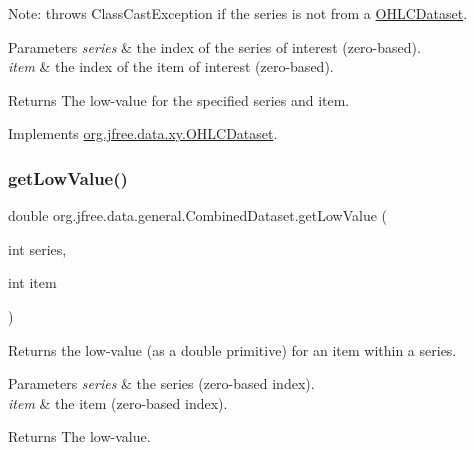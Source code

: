 Note\+: throws {\ttfamily Class\+Cast\+Exception} if the series is not from a \mbox{\hyperlink{}{O\+H\+L\+C\+Dataset}}.


\begin{DoxyParams}{Parameters}
{\em series} & the index of the series of interest (zero-\/based). \\
\hline
{\em item} & the index of the item of interest (zero-\/based).\\
\hline
\end{DoxyParams}
\begin{DoxyReturn}{Returns}
The low-\/value for the specified series and item. 
\end{DoxyReturn}


Implements \mbox{\hyperlink{interfaceorg_1_1jfree_1_1data_1_1xy_1_1_o_h_l_c_dataset_a87d7730829e66f23a2601c3519cf828a}{org.\+jfree.\+data.\+xy.\+O\+H\+L\+C\+Dataset}}.

\mbox{\label{classorg_1_1jfree_1_1data_1_1general_1_1_combined_dataset_a6bbbc0af890605eb5a42974c29a9c85b}} 
\subsubsection{\texorpdfstring{get\+Low\+Value()}{getLowValue()}}
{\footnotesize\ttfamily double org.\+jfree.\+data.\+general.\+Combined\+Dataset.\+get\+Low\+Value (\begin{DoxyParamCaption}\item[{int}]{series,  }\item[{int}]{item }\end{DoxyParamCaption})}

Returns the low-\/value (as a double primitive) for an item within a series.


\begin{DoxyParams}{Parameters}
{\em series} & the series (zero-\/based index). \\
\hline
{\em item} & the item (zero-\/based index).\\
\hline
\end{DoxyParams}
\begin{DoxyReturn}{Returns}
The low-\/value. 
\end{DoxyReturn}


